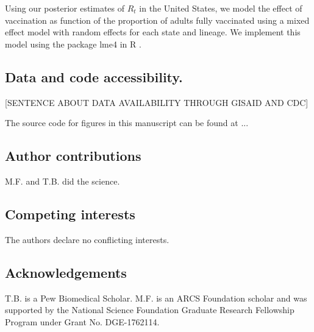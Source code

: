 \documentclass[12pt]{article}
\begin{document}
Using our posterior estimates of $R_{t}$ in the United States, we model the effect of vaccination as function of the proportion of adults fully vaccinated using a mixed effect model with random effects for each state and lineage. We implement this model using the package lme4 in R \cites{Bates2015, RLang2017}.


\subsection*{Data and code accessibility.}%

[SENTENCE ABOUT DATA AVAILABILITY THROUGH GISAID AND CDC]

The source code for figures in this manuscript can be found at ...

\subsection*{Author contributions}%

M.F. and T.B. did the science.

\subsection*{Competing interests}%

The authors declare no conflicting interests.

\subsection*{Acknowledgements}%
 
T.B. is a Pew Biomedical Scholar.
M.F. is an ARCS Foundation scholar and was supported by the National Science Foundation Graduate Research Fellowship Program under Grant No. DGE-1762114.
\end{document}
